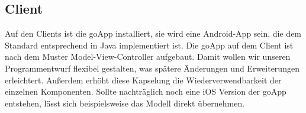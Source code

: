 \begin {center}
\end {center}


	\subsection{Client}
	Auf den Clients ist die goApp installiert, sie wird eine Android-App sein, die dem Standard entsprechend in Java implementiert ist.
	Die goApp auf dem Client ist nach dem Muster Model-View-Controller aufgebaut. Damit wollen wir unseren Programmentwurf flexibel gestalten, was spätere Änderungen und Erweiterungen erleichtert. Außerdem erhöht diese Kapselung die Wiederverwendbarkeit der einzelnen Komponenten.
Sollte nachträglich noch eine iOS Version der goApp entstehen, lässt sich beispielsweise das Modell direkt übernehmen.
	
